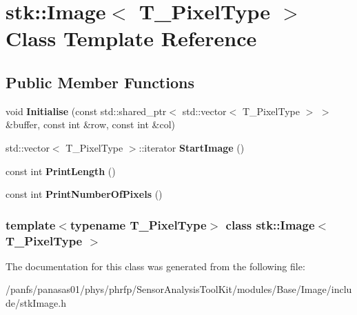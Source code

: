 \hypertarget{classstk_1_1Image}{
\section{stk::Image$<$ T\_\-PixelType $>$ Class Template Reference}
\label{classstk_1_1Image}
}
\subsection*{Public Member Functions}
\begin{DoxyCompactItemize}
\item 
\hypertarget{classstk_1_1Image_ab8865ecc71a91cda2efedde4bec6086b}{
void {\bfseries Initialise} (const std::shared\_\-ptr$<$ std::vector$<$ T\_\-PixelType $>$ $>$ \&buffer, const int \&row, const int \&col)}
\label{classstk_1_1Image_ab8865ecc71a91cda2efedde4bec6086b}

\item 
\hypertarget{classstk_1_1Image_a77fcc8868a45467f6757829df3535ca6}{
std::vector$<$ T\_\-PixelType $>$::iterator {\bfseries StartImage} ()}
\label{classstk_1_1Image_a77fcc8868a45467f6757829df3535ca6}

\item 
\hypertarget{classstk_1_1Image_abc46bf2c3dcbd17459dc85b0e00b5fd0}{
const int {\bfseries PrintLength} ()}
\label{classstk_1_1Image_abc46bf2c3dcbd17459dc85b0e00b5fd0}

\item 
\hypertarget{classstk_1_1Image_a1b4b31ad3bbb33c2df0051278c433ca5}{
const int {\bfseries PrintNumberOfPixels} ()}
\label{classstk_1_1Image_a1b4b31ad3bbb33c2df0051278c433ca5}

\end{DoxyCompactItemize}
\subsubsection*{template$<$typename T\_\-PixelType$>$ class stk::Image$<$ T\_\-PixelType $>$}



The documentation for this class was generated from the following file:\begin{DoxyCompactItemize}
\item 
/panfs/panasas01/phys/phrfp/SensorAnalysisToolKit/modules/Base/Image/include/stkImage.h\end{DoxyCompactItemize}
